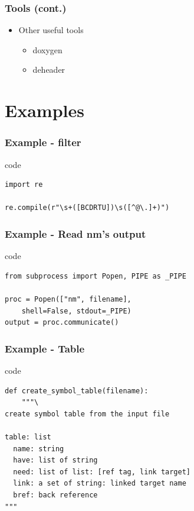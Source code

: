 \begin{frame}[t]
	\frametitle{Tools (cont.)}
	\begin{itemize}
		\item Other useful tools
		\begin{itemize}
			\item<+-|alert@+> doxygen
			\item<+-|alert@+> deheader
		\end{itemize}
	\end{itemize}
\end{frame}


\section{Examples}
\begin{frame}[fragile]
	\frametitle{Example - filter}
	\begin{block}{code}
		\begin{lstlisting}
import re

re.compile(r"\s+([BCDRTU])\s([^@\.]+)")
		\end{lstlisting}
	\end{block}
\end{frame}

\begin{frame}[fragile]
	\frametitle{Example - Read nm's output}
	\begin{block}{code}
		\begin{lstlisting}
from subprocess import Popen, PIPE as _PIPE

proc = Popen(["nm", filename],
    shell=False, stdout=_PIPE)
output = proc.communicate()
		\end{lstlisting}
	\end{block}
\end{frame}

\begin{frame}[fragile]
	\frametitle{Example - Table}
	\begin{block}{code}
		\begin{lstlisting}
def create_symbol_table(filename):
    """\
create symbol table from the input file

table: list
  name: string
  have: list of string
  need: list of list: [ref tag, link target]
  link: a set of string: linked target name
  bref: back reference
"""
		\end{lstlisting}
	\end{block}
\end{frame}

